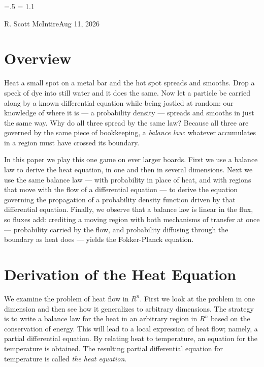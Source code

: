 

\parindent=0pt
\parskip=.5\baselineskip
\baselineskip = 1.1\baselineskip

\footline{\hss\tenrm\folio\hss}

{R. Scott McIntire}{Aug 11, 2026}

\section{Overview}

Heat a small spot on a metal bar and the hot spot spreads and smooths.
Drop a speck of dye into still water and it does the same. Now let a
particle be carried along by a known differential equation while being
jostled at random: our knowledge of where it is --- a probability
density --- spreads and smooths in just the same way. Why do all three
spread by the same law? Because all three are governed by the same
piece of bookkeeping, a {\it balance law\/}: whatever accumulates in a
region must have crossed its boundary.

In this paper we play this one game on ever larger boards. First we
use a balance law to derive the heat equation, in one and then in
several dimensions. Next we use the same balance law --- with
probability in place of heat, and with regions that move with the flow
of a differential equation --- to derive the equation governing the
propagation of a probability density function driven by that
differential equation. Finally, we observe that a balance law is
linear in the flux, so fluxes add: crediting a moving region with both
mechanisms of transfer at once --- probability carried by the flow,
and probability diffusing through the boundary as heat does ---
yields the Fokker-Planck equation.


\section{Derivation of the Heat Equation}

We examine the problem of heat flow in $R^n$. First we look at the 
problem in one dimension and then see how it generalizes to arbitrary
dimensions. The strategy is to write a balance law for the heat in 
an arbitrary region in $R^n$ based on the conservation of energy. 
This will lead to a local expression of heat flow;
namely, a partial differential equation. By relating heat to temperature,
an equation for the temperature is obtained.
The resulting partial differential equation for temperature is called
{\it the heat equation\/}.

